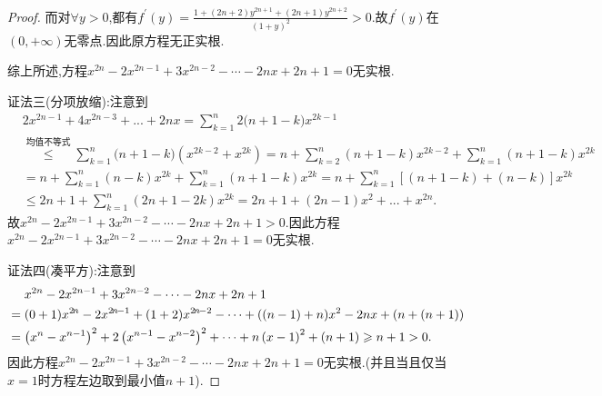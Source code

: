 \documentclass[lang=cn,newtx,10pt,scheme=chinese]{../Template/elegantbook}
\begin{document}
\begin{proof}
    而对\(\forall y > 0\),都有\(f^{\prime}(y) = \frac{1 + (2n + 2)y^{2n + 1} + (2n + 1)y^{2n + 2}}{(1 + y)^2} > 0\).故\(f^{\prime}(y)\)在\((0, +\infty)\)无零点.因此原方程无正实根.

    综上所述,方程\(x^{2n} - 2x^{2n - 1} + 3x^{2n - 2} - \cdots - 2nx + 2n + 1 = 0\)无实根.

    {\color{blue}证法三(分项放缩):}注意到
    \begin{align*}
        &2x^{2n-1}+4x^{2n-3}+...+2nx=\sum_{k=1}^n{2(n}+1-k)x^{2k-1}
        \\
        &\overset{\hyperref[note:1.1111]{\text{均值不等式}}}{\leqslant}\sum_{k=1}^n{(n}+1-k)\left( x^{2k-2}+x^{2k} \right) =n+\sum_{k=2}^n{(n+1-k)x^{2k-2}}+\sum_{k=1}^n{(n+1-k)x^{2k}}
        \\
        &=n+\sum_{k=1}^n{(n-k)x^{2k}}+\sum_{k=1}^n{(n+1-k)x^{2k}}=n+\sum_{k=1}^n{\left[ (n+1-k)+(n-k) \right] x^{2k}}
        \\
        &\leqslant 2n+1+\sum_{k=1}^n{(2n+1-2k)x^{2k}}=2n+1+(2n-1)x^2+...+x^{2n}.
    \end{align*}
    故\(x^{2n} - 2x^{2n - 1} + 3x^{2n - 2} - \cdots - 2nx + 2n + 1 > 0\).因此方程\(x^{2n} - 2x^{2n - 1} + 3x^{2n - 2} - \cdots - 2nx + 2n + 1 = 0\)无实根.

    {\color{blue}证法四(凑平方):}注意到
    \begin{align*}\label{eq:别样的凑平方技巧}
        &\,\,\,\,\,\,\,\,x^{2n}-2x^{2n-1}+3x^{2n-2}-\cdots -2nx+2n+1
\\
&=(0+1)x^{2\hskip -1pt n}-2x^{2\hskip -1pt n\hskip -1pt -1}+(1+2)x^{2\hskip -1pt n\hskip -1pt -2}-\cdots+((n-1)+n)x^2-2nx+(n+(n+1))
\\
&=\left( x^n-x^{n-1} \right) ^2+2\left( x^{n-1}-x^{n-2} \right) ^2+\cdots +n\left( x-1 \right) ^2+\left( n+1 \right) \geqslant n+1>0.
    \end{align*}
    因此方程\(x^{2n} - 2x^{2n - 1} + 3x^{2n - 2} - \cdots - 2nx + 2n + 1 = 0\)无实根.(并且当且仅当\(x = 1\)时方程左边取到最小值\(n + 1\)).
\end{proof}
\end{document}
